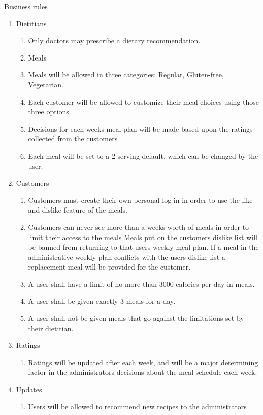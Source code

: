 \documentclass[a4paper,10pt,toc=graduated]{article}
\begin{document}
\begin{mySubsection}{Business rules}
\renewcommand{\labelenumi}{}
\renewcommand{\labelenumii}{\arabic{enumii}. }
\begin{enumerate}
\item
Dietitians
\begin{enumerate}
\item
Only doctors may prescribe a dietary recommendation.
\item
Meals
\item
Meals will be  allowed in three categories: Regular, Gluten-free, Vegetarian. 
\item
Each customer will be allowed to customize their meal choices using those three options. 
\item
Decisions for each weeks meal plan will be made based upon the ratings collected from the customers
\item
Each meal will be set to a 2 serving default, which can be changed by the user.
\end{enumerate}
\item
Customers
\begin{enumerate}
\item
Customers must create their own personal log in in order to use the like and dislike feature of the meals.
\item
Customers can never see more than a weeks worth of meals in order to limit their access to the meals
Meals put on the customers dislike list will be banned from returning to that users weekly meal plan. If a meal in the administrative weekly plan conflicts with the users dislike list a replacement meal will be provided for the customer. 
\item
A user shall have a limit of no more than 3000 calories per day in meals.
\item
A user shall be given exactly 3 meals for a day.
\item
A user shall not be given meals that go against the limitations set by their dietitian.
\end{enumerate}
\item
Ratings
\begin{enumerate}
\item
Ratings will be updated after each week, and will be a major determining factor in the administrators decisions about the meal schedule each week.
\end{enumerate}
\item
Updates
\begin{enumerate}
\item
Users will be allowed to recommend new recipes to the administrators 
\end{enumerate}
\end{enumerate}
\end{mySubsection}
 
\end{document}
